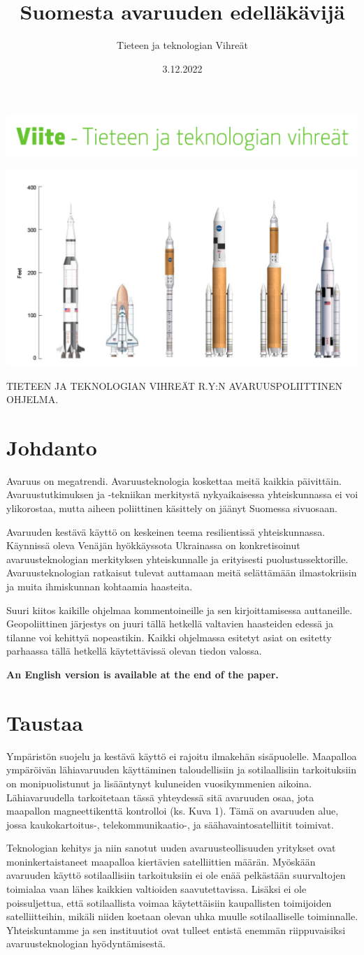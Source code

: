 \documentclass[nobib,finnish,oneside,openany,notoc,a4paper]{tufte-book}
\title{Suomesta avaruuden edelläkävijä}
\author{Tieteen ja teknologian Vihreät}
\date{3.12.2022}
\newcommand{\textls}[2][5]{%
    \begingroup\addfontfeatures{LetterSpace=#1}#2\endgroup
  }
\renewcommand{\allcaps}[1]{\textls[15]{\MakeTextUppercase{#1}}}
\renewcommand{\maketitlepage}[0]{%
  \cleardoublepage%
  {%

  \sffamily%
  \begin{fullwidth}%
    \includegraphics[width=14cm]{Viite cmyk green.pdf}
  \vspace{8.5pc}%
  \fontsize{32}{50}\spartan{\par\noindent\textcolor{vihrea}{\allcaps{\thanklesstitle}}}
  \vspace{6pc}%
  
  \includegraphics[width=15cm]{etusivu.png}

  \vspace{6pc}%

  \fontsize{9}{16}\selectfont\par\noindent\allcaps{Tieteen ja teknologian vihreät r.y:n avaruuspoliittinen ohjelma.}%

  \end{fullwidth}%
  }

  \thispagestyle{empty}%
  \clearpage%
}
\begin{document}
\maketitlepage

\chapter{Johdanto}

Avaruus on megatrendi. Avaruusteknologia koskettaa meitä kaikkia
päivittäin. Avaruustutkimuksen ja -tekniikan merkitystä nykyaikaisessa
yhteiskunnassa ei voi ylikorostaa, mutta aiheen poliittinen käsittely on
jäänyt Suomessa sivuosaan.

Avaruuden kestävä käyttö on keskeinen teema resilientissä
yhteiskunnassa. Käynnissä oleva Venäjän hyökkäyssota Ukrainassa on
konkretisoinut avaruusteknologian merkityksen yhteiskunnalle ja
erityisesti puolustussektorille. Avaruusteknologian ratkaisut tulevat
auttamaan meitä selättämään ilmastokriisin ja muita ihmiskunnan
kohtaamia haasteita.

Suuri kiitos kaikille ohjelmaa kommentoineille ja sen kirjoittamisessa
auttaneille. Geopoliittinen järjestys on juuri tällä hetkellä valtavien
haasteiden edessä ja tilanne voi kehittyä nopeastikin. Kaikki ohjelmassa
esitetyt asiat on esitetty parhaassa tällä hetkellä käytettävissä olevan
tiedon valossa.

\textbf{An English version is available at the end of the paper. }

\chapter{Taustaa}

Ympäristön suojelu ja kestävä käyttö ei rajoitu ilmakehän sisäpuolelle.
Maapalloa ympäröivän lähiavaruuden käyttäminen taloudellisiin ja
sotilaallisiin tarkoituksiin on monipuolistunut ja lisääntynyt
kuluneiden vuosikymmenien aikoina. Lähiavaruudella tarkoitetaan tässä
yhteydessä sitä avaruuden osaa, jota maapallon magneettikenttä
kontrolloi (ks. Kuva 1). Tämä on avaruuden alue, jossa kaukokartoitus-,
telekommunikaatio-, ja säähavaintosatelliitit toimivat.

Teknologian kehitys ja niin sanotut uuden avaruusteollisuuden yritykset
ovat moninkertaistaneet maapalloa kiertävien satelliittien määrän.
Myöskään avaruuden käyttö sotilaallisiin tarkoituksiin ei ole enää
pelkästään suurvaltojen toimialaa vaan lähes kaikkien valtioiden
saavutettavissa. Lisäksi ei ole poissuljettua, että sotilaallista voimaa
käytettäisiin kaupallisten toimijoiden satelliitteihin, mikäli niiden
koetaan olevan uhka muulle sotilaalliselle toiminnalle. Yhteiskuntamme
ja sen instituutiot ovat tulleet entistä enemmän riippuvaisiksi
avaruusteknologian hyödyntämisestä.
\end{document}
